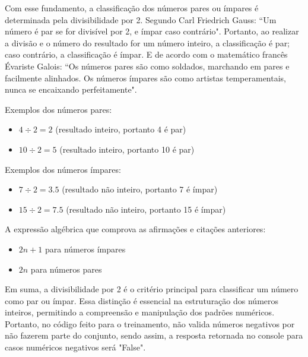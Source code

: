 \documentclass{article}
\begin{document}
\begin{flushleft}
Com esse fundamento, a classificação dos números pares ou ímpares é determinada pela divisibilidade por 2. Segundo Carl Friedrich Gauss: ``Um número é par se for divisível por 2, e ímpar caso contrário". Portanto, ao realizar a divisão e o número do resultado for um número inteiro, a classificação é par; caso contrário, a classificação é ímpar. E de acordo com o matemático francês Évariste Galois: ``Os números pares são como soldados, marchando em pares e facilmente alinhados. Os números ímpares são como artistas temperamentais, nunca se encaixando perfeitamente".
\end{flushleft}
\newpage
\begin{flushleft}
Exemplos dos números pares:
\end{flushleft}

\begin{itemize}
  \item $4 \div 2 = 2$ (resultado inteiro, portanto 4 é par)
  \item $10 \div 2 = 5$ (resultado inteiro, portanto 10 é par)
\end{itemize}

\begin{flushleft}
Exemplos dos números ímpares:
\end{flushleft}

\begin{itemize}
  \item $7 \div 2 = 3.5$ (resultado não inteiro, portanto 7 é ímpar)
  \item $15 \div 2 = 7.5$ (resultado não inteiro, portanto 15 é ímpar)
\end{itemize}

\begin{flushleft}
A expressão algébrica que comprova as afirmações e citações anteriores:
\end{flushleft}

\begin{itemize}
  \item $2n + 1$ para números ímpares
  \item $2n$ para números pares
\end{itemize}
\begin{flushleft}
Em suma, a divisibilidade por 2 é o critério principal para classificar um número como par ou ímpar. Essa distinção é essencial na estruturação dos números inteiros, permitindo a compreensão e manipulação dos padrões numéricos. Portanto, no código feito para o treinamento, não valida números negativos por não fazerem parte do conjunto, sendo assim, a resposta retornada no console para casos numéricos negativos será "False".
\end{flushleft}
\end{document}

